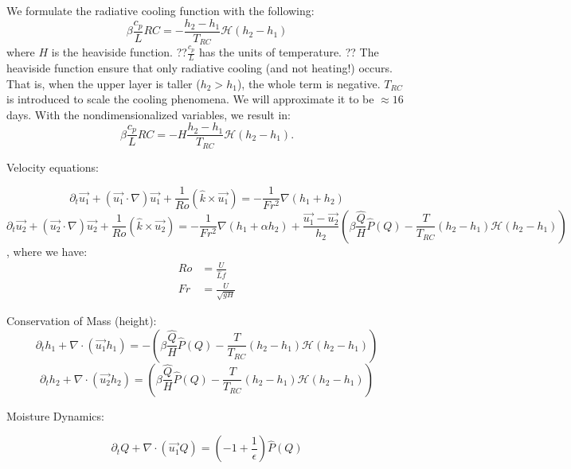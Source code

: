 \documentclass[10pt]{article}
\newcommand{\HH}{\mathcal{H}}
\begin{document}
We formulate the radiative cooling function with the following:
\begin{equation}
\beta \frac{c_p}{L} RC = -\frac{h_2-h_1}{T_{RC}}\HH(h_2-h_1)
\end{equation}
where $H$ is the heaviside function. ??$\frac{c_p}{L}$ has the units of temperature. ?? The heaviside function ensure that only radiative cooling (and not heating!) occurs. That is, when the upper layer  is taller ($h_2 > h_1$), the whole term is negative. $T_{RC}$ is introduced to scale the cooling phenomena. We will approximate it to be $\approx 16$ days. With the nondimensionalized variables, we result in:
\begin{equation}
\beta \frac{c_p}{L} RC = -H\frac{h_2-h_1}{T_{RC}}\HH(h_2-h_1).
\end{equation}


Velocity equations:

\begin{equation}
\partial_{t} \vec{u_1} + (\vec{u_1}\cdot \nabla)\vec{u_1} + \frac{1}{Ro}(\hat{k}\times \vec{u_1}) = -\frac{1}{Fr^2}\nabla (h_1 +h_2)
\label{NDVel1}
\end{equation}
\begin{equation}
\partial_{t} \vec{u_2} + (\vec{u_2}\cdot \nabla)\vec{u_2} + \frac{1}{Ro}(\hat{k}\times \vec{u_2}) = -\frac{1}{Fr^2}\nabla (h_1 +\alpha h_2) +  \frac{\vec{u_1}-\vec{u_2}}{h_2}\left(\beta\frac{\hat{Q}}{H}\hat{P}(Q)-\frac{T}{T_{RC}}(h_2-h_1)\HH(h_2-h_1)\right)
\label{NDVel2}
\end{equation}
, where we have:
\begin{align*}
Ro &= \frac{U}{\hat{L}f} \\ 
Fr &= \frac{U}{\sqrt{gH}}
\end{align*}

Conservation of Mass (height):
\begin{equation}
\partial_{t}h_1 + \nabla \cdot (\vec{u_1}h_1) = -\left(\beta\frac{\hat{Q}}{H}\hat{P}(Q)-\frac{T}{T_{RC}}(h_2-h_1)\HH(h_2-h_1)\right)
\label{NDHei1}
\end{equation}
\begin{equation}
\partial_{t}h_2 + \nabla \cdot (\vec{u_2}h_2) = \left(\beta\frac{\hat{Q}}{H}\hat{P}(Q)-\frac{T}{T_{RC}}(h_2-h_1)\HH(h_2-h_1)\right)
\label{NDHei2}
\end{equation}

Moisture Dynamics:

\begin{equation}
\partial_{t} Q + \nabla \cdot (\vec{u_1}Q) = \left(-1+\frac{1}{\epsilon}\right) \hat{P}(Q)
\label{NDMoi}
\end{equation}
\end{document}

